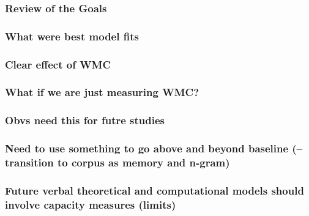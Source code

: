 \documentclass[]{book}
\theoremstyle{definition}
\theoremstyle{definition}
\theoremstyle{definition}
\theoremstyle{remark}
\begin{document}
\hypertarget{review-of-the-goals}{%
\subsubsection{Review of the Goals}\label{review-of-the-goals}}

\hypertarget{what-were-best-model-fits}{%
\subsubsection{What were best model
fits}\label{what-were-best-model-fits}}

\hypertarget{clear-effect-of-wmc}{%
\subsubsection{Clear effect of WMC}\label{clear-effect-of-wmc}}

\hypertarget{what-if-we-are-just-measuring-wmc}{%
\subsubsection{What if we are just measuring
WMC?}\label{what-if-we-are-just-measuring-wmc}}

\hypertarget{obvs-need-this-for-futre-studies}{%
\subsubsection{Obvs need this for futre
studies}\label{obvs-need-this-for-futre-studies}}

\hypertarget{need-to-use-something-to-go-above-and-beyond-baseline-transition-to-corpus-as-memory-and-n-gram}{%
\subsubsection{Need to use something to go above and beyond baseline
(--transition to corpus as memory and
n-gram)}\label{need-to-use-something-to-go-above-and-beyond-baseline-transition-to-corpus-as-memory-and-n-gram}}

\hypertarget{future-verbal-theoretical-and-computational-models-should-involve-capacity-measures-limits}{%
\subsubsection{Future verbal theoretical and computational models should
involve capacity measures
(limits)}\label{future-verbal-theoretical-and-computational-models-should-involve-capacity-measures-limits}}
\end{document}
